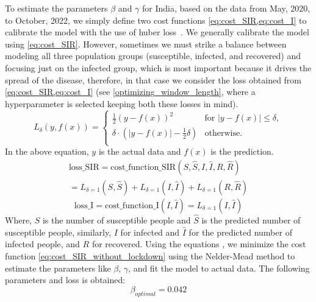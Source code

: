 \documentclass[tikz,fleqn,12pt]{wlscirep}
\begin{document}
To estimate the parameters $\beta$ and $\gamma$ for India, based on the data from May, 2020, to October, 2022, we simply define two cost functions \cref{eq:cost_SIR,eq:cost_I} to calibrate the model with the use of huber loss~\cite{huberloss}. We generally calibrate the model using \cref{eq:cost_SIR}. However, sometimes we must strike a balance between modeling all three population groups (susceptible, infected, and recovered) and focusing just on the infected group, which is most important because it drives the spread of the disease, therefore, in that case we consider the loss obtained from \cref{eq:cost_SIR,eq:cost_I} (see \cref{optimizing_window_length}, where a hyperparameter is selected keeping both these losses in mind).
\begin{equation}
  L_{\delta}(y, f(x)) = 
  \begin{cases}
    \frac{1}{2}{(y - f(x))^2} & \text{for } |y - f(x)| \leq \delta, \\
    \delta \cdot (|y - f(x)| - \frac{1}{2}\delta) & \text{otherwise.} \\
  \end{cases}
  \label{eq:huberloss}
\end{equation}
In the above equation, $y$ is the actual data and $f(x)$ is the prediction.
\begin{equation}
  \begin{split}
  \textrm{loss\_SIR} = \textrm{cost\_function\_SIR}(S, \hat{S}, I, \hat{I}, R, \hat{R}) \\
  = L_{\delta = 1}(S, \hat{S}) + L_{\delta = 1}(I, \hat{I}) + L_{\delta = 1}(R, \hat{R})
  \end{split}
  \label{eq:cost_SIR}
\end{equation}
\begin{equation}
  \textrm{loss\_I} = \textrm{cost\_function\_I}(I, \hat{I}) = L_{\delta = 1}(I, \hat{I})
  \label{eq:cost_I}
\end{equation}
Where, $S$ is the number of susceptible people and $\hat{S}$ is the predicted number of susceptible people, similarly, $I$ for infected and $\hat{I}$ for the predicted number of infected people, and $R$ for recovered. Using the equations  , we minimize the cost function \cref{eq:cost_SIR_without_lockdown} using the Nelder-Mead method\cite{Gao2010} to estimate the parameters like $\beta$, $\gamma$, and fit the model to actual data. The following parameters and loss is obtained:
\begin{equation}
  \beta_{optimal} = 0.042
  \label{eq:beta_optimal_without_lockdown}
\end{equation}
\end{document}
